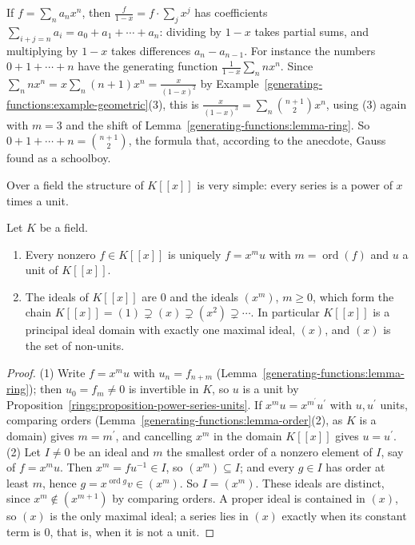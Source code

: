 \begin{example}\label{generating-functions:example-partial-sums}
If $f = \sum_na_nx^n$, then $\frac{f}{1 - x} = f \cdot \sum_jx^j$ has coefficients $\sum_{i+j=n}a_i = a_0 + a_1 + \cdots + a_n$: dividing by $1 - x$ takes partial sums, and multiplying by
$1 - x$ takes differences $a_n - a_{n-1}$. For instance the numbers $0 + 1 + \cdots + n$ have the generating function $\frac{1}{1 - x}\sum_nnx^n$. Since $\sum_nnx^n = x\sum_n(n + 1)x^n =
\frac{x}{(1 - x)^2}$ by Example~\ref{generating-functions:example-geometric}(3), this is $\frac{x}{(1 - x)^3} = \sum_n\binom{n + 1}{2}x^n$, using (3) again with $m = 3$ and the shift of
Lemma~\ref{generating-functions:lemma-ring}. So $0 + 1 + \cdots + n = \binom{n + 1}{2}$, the formula that, according to the anecdote, Gauss found as a schoolboy.
\end{example}

Over a field the structure of $K[[x]]$ is very simple: every series is a power of $x$ times a unit.

\begin{proposition}\label{generating-functions:proposition-field-coefficients}
Let $K$ be a field.
\begin{enumerate}
\item Every nonzero $f \in K[[x]]$ is uniquely $f = x^mu$ with $m = \operatorname{ord}(f)$ and $u$ a unit of $K[[x]]$.
\item The ideals of $K[[x]]$ are $0$ and the ideals $(x^m)$, $m \geq 0$, which form the chain $K[[x]] = (1) \supsetneq (x) \supsetneq (x^2) \supsetneq \cdots$. In particular $K[[x]]$ is a principal
ideal domain with exactly one maximal ideal, $(x)$, and $(x)$ is the set of non-units.
\end{enumerate}
\end{proposition}

\begin{proof}
(1) Write $f = x^mu$ with $u_n = f_{n+m}$ (Lemma~\ref{generating-functions:lemma-ring}); then $u_0 = f_m \neq 0$ is invertible in $K$, so $u$ is a unit by
Proposition~\ref{rings:proposition-power-series-units}. If $x^mu = x^{m^{\prime}}u^{\prime}$ with $u, u^{\prime}$ units, comparing orders (Lemma~\ref{generating-functions:lemma-order}(2), as $K$ is a domain)
gives $m = m^{\prime}$, and cancelling $x^m$ in the domain $K[[x]]$ gives $u = u^{\prime}$.
(2) Let $I \neq 0$ be an ideal and $m$ the smallest order of a nonzero element of $I$, say of $f = x^mu$. Then $x^m = fu^{-1} \in I$, so $(x^m) \subseteq I$; and every $g \in I$ has order at least $m$,
hence $g = x^{\operatorname{ord} g}v \in (x^m)$. So $I = (x^m)$. These ideals are distinct, since $x^m \notin (x^{m+1})$ by comparing orders. A proper ideal is contained in $(x)$, so $(x)$ is the only
maximal ideal; a series lies in $(x)$ exactly when its constant term is $0$, that is, when it is not a unit.
\end{proof}

